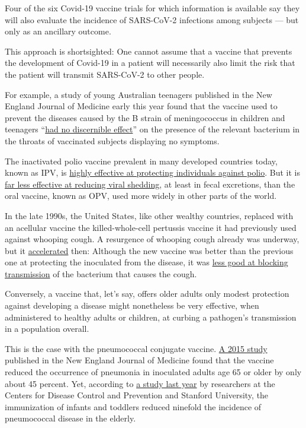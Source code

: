Four of the six Covid-19 vaccine trials for which information is
available say they will also evaluate the incidence of SARS-CoV-2
infections among subjects --- but only as an ancillary outcome.

This approach is shortsighted: One cannot assume that a vaccine that
prevents the development of Covid-19 in a patient will necessarily also
limit the risk that the patient will transmit SARS-CoV-2 to other
people.

For example, a study of young Australian teenagers published in the New
England Journal of Medicine early this year found that the vaccine used
to prevent the diseases caused by the B strain of meningococcus in
children and teenagers
``\href{https://www.nejm.org/doi/full/10.1056/NEJMoa1900236}{had no
discernible effect}'' on the presence of the relevant bacterium in the
throats of vaccinated subjects displaying no symptoms.

The inactivated polio vaccine prevalent in many developed countries
today, known as IPV, is
\href{https://www.cdc.gov/vaccines/vpd/polio/hcp/effectiveness-duration-protection.html\#:~:text=Two\%20doses\%20of\%20inactivated\%20polio,of\%20IPV\%20and\%20tOPV\%2C\%20or}{highly
effective at protecting individuals against polio}. But it is
\href{https://www.who.int/immunization/diseases/poliomyelitis/endgame_objective2/rationale/en/index3.html}{far
less effective at reducing viral shedding}, at least in fecal
excretions, than the oral vaccine, known as OPV, used more widely in
other parts of the world.

In the late 1990s, the United States, like other wealthy countries,
replaced with an acellular vaccine the killed-whole-cell pertussis
vaccine it had previously used against whooping cough. A resurgence of
whooping cough already was underway, but it
\href{https://www.ncbi.nlm.nih.gov/pmc/articles/PMC5580413/pdf/f1000research-6-12588.pdf}{accelerated}
then: Although the new vaccine was better than the previous one at
protecting the inoculated from the disease, it was
\href{https://www.pnas.org/content/111/2/787.long}{less good at blocking
transmission} of the bacterium that causes the cough.

Conversely, a vaccine that, let's say, offers older adults only modest
protection against developing a disease might nonetheless be very
effective, when administered to healthy adults or children, at curbing a
pathogen's transmission in a population overall.

This is the case with the pneumococcal conjugate vaccine.
\href{https://www.nejm.org/doi/full/10.1056/nejmoa1408544}{A 2015 study}
published in the New England Journal of Medicine found that the vaccine
reduced the occurrence of pneumonia in inoculated adults age 65 or older
by only about 45 percent. Yet, according to
\href{https://www.cdc.gov/mmwr/volumes/68/wr/mm6846a5.htm}{a study last
year} by researchers at the Centers for Disease Control and Prevention
and Stanford University, the immunization of infants and toddlers
reduced ninefold the incidence of pneumococcal disease in the elderly.

